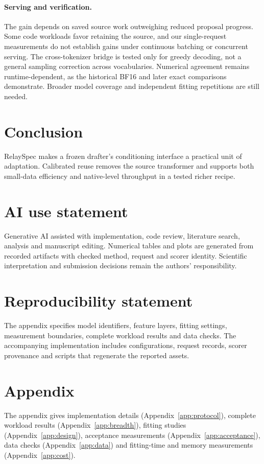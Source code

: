 \documentclass{article}
\begin{document}
\paragraph{Serving and verification.}
The gain depends on saved source work outweighing reduced proposal
progress. Some code workloads favor retaining the source, and our
single-request measurements do not establish gains under continuous
batching or concurrent serving. The cross-tokenizer bridge is tested
only for greedy decoding, not a general sampling correction across
vocabularies. Numerical agreement remains runtime-dependent, as the
historical BF16 and later exact comparisons demonstrate. Broader model
coverage and independent fitting repetitions are still needed.

\section{Conclusion}
\label{sec:scope}
RelaySpec makes a frozen drafter's conditioning interface a practical
unit of adaptation. Calibrated reuse removes the source transformer and
supports both small-data efficiency and native-level throughput in a
tested richer recipe.

\label{maintextend}
\section*{AI use statement}
Generative AI assisted with implementation, code review, literature search,
analysis and manuscript editing. Numerical tables and plots are generated
from recorded artifacts with checked method, request and scorer identity.
Scientific interpretation and submission decisions remain the authors'
responsibility.

\section*{Reproducibility statement}
The appendix specifies model identifiers, feature layers, fitting settings,
measurement boundaries, complete workload results and data checks.
The accompanying implementation includes configurations, request records,
scorer provenance and scripts that regenerate the reported assets.



\clearpage
\appendix
\raggedbottom
\section*{Appendix}
The appendix gives implementation details (Appendix~\ref{app:protocol}),
complete workload results (Appendix~\ref{app:breadth}), fitting studies
(Appendix~\ref{app:design}), acceptance measurements
(Appendix~\ref{app:acceptance}), data checks (Appendix~\ref{app:data})
and fitting-time and memory measurements (Appendix~\ref{app:cost}).
\end{document}
